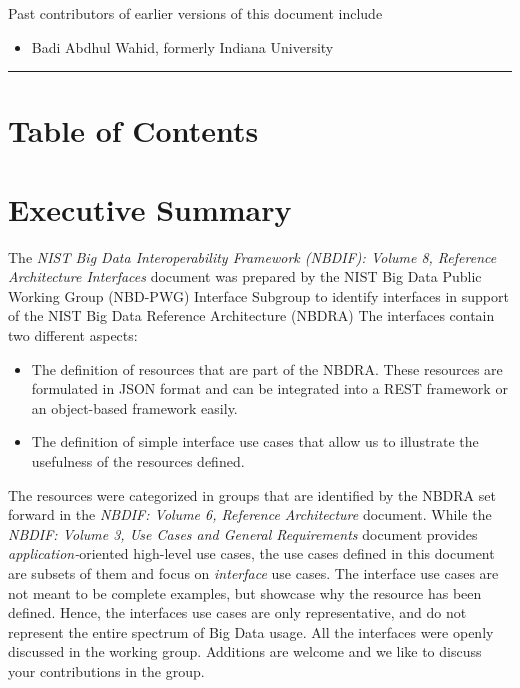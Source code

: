 \documentclass[9pt,]{article}
\providecommand{\tightlist}{%
  \setlength{\itemsep}{0pt}\setlength{\parskip}{0pt}}
\begin{document}
Past contributors of earlier versions of this document include

\begin{itemize}
\tightlist
\item
  Badi Abdhul Wahid, formerly Indiana University
\end{itemize}

\begin{center}\rule{0.5\linewidth}{\linethickness}\end{center}

\hypertarget{table-of-contents}{%
\section{Table of Contents}\label{table-of-contents}}

\hypertarget{executive-summary}{%
\section{Executive Summary}\label{executive-summary}}

The \emph{NIST Big Data Interoperability Framework (NBDIF): Volume 8,
Reference Architecture Interfaces} document was prepared by the NIST Big
Data Public Working Group (NBD-PWG) Interface Subgroup to identify
interfaces in support of the NIST Big Data Reference Architecture
(NBDRA) The interfaces contain two different aspects:

\begin{itemize}
\item
  The definition of resources that are part of the NBDRA. These
  resources are formulated in JSON format and can be integrated into a
  REST framework or an object-based framework easily.
\item
  The definition of simple interface use cases that allow us to
  illustrate the usefulness of the resources defined.
\end{itemize}

The resources were categorized in groups that are identified by the
NBDRA set forward in the \emph{NBDIF: Volume 6, Reference Architecture}
document. While the \emph{NBDIF: Volume 3, Use Cases and General
Requirements} document provides \emph{application-}oriented high-level
use cases, the use cases defined in this document are subsets of them
and focus on \emph{interface} use cases. The interface use cases are not
meant to be complete examples, but showcase why the resource has been
defined. Hence, the interfaces use cases are only representative, and do
not represent the entire spectrum of Big Data usage. All the interfaces
were openly discussed in the working group. Additions are welcome and we
like to discuss your contributions in the group.
\end{document}
